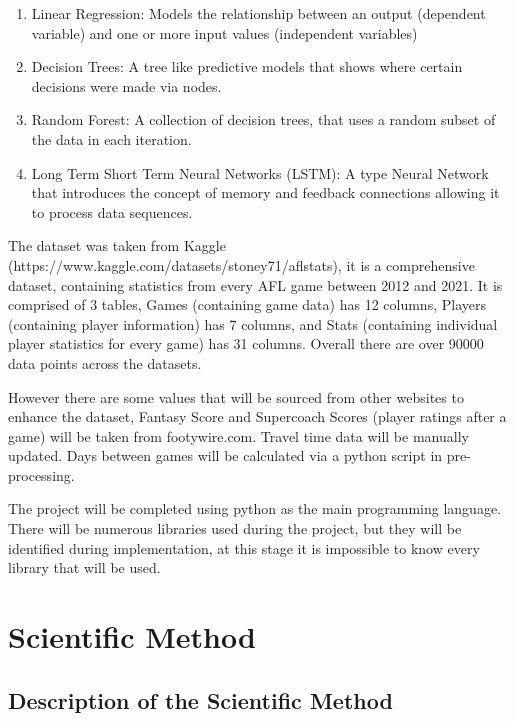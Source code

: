 \documentclass{imc-inf}
\begin{document}
	\begin{enumerate}
		\item[] Linear Regression: Models the relationship between an output (dependent variable) and one or more input values (independent variables)
		\item[] Decision Trees: A tree like predictive models that shows where certain decisions were made via nodes.
		\item[] Random Forest: A collection of decision trees, that uses a random subset of the data in each iteration.
		\item[] Long Term Short Term Neural Networks (LSTM): A type Neural Network that introduces the concept of memory and feedback connections allowing it to process data sequences.
	\end{enumerate}
	
	The dataset was taken from Kaggle (https://www.kaggle.com/datasets/stoney71/aflstats), it is a comprehensive dataset, containing statistics from every AFL game between 2012 and 2021. It is comprised of 3 tables, Games (containing game data) has 12 columns, Players (containing player information) has 7 columns, and Stats (containing individual player statistics for every game) has 31 columns. Overall there are over 90000 data points across the datasets.
	
	
	However there are some values that will be sourced from other websites to enhance the dataset, Fantasy Score and Supercoach Scores (player ratings after a game) will be taken from footywire.com. Travel time data will be manually updated. Days between games will be calculated via a python script in pre-processing.
	
	
	The project will be completed using python as the main programming language. There will be numerous libraries used during the project, but they will be identified during implementation, at this stage it is impossible to know every library that will be used.
	
	\chapter{Scientific Method}\label{chap:method}
	\section{Description of the Scientific Method }
\end{document}
